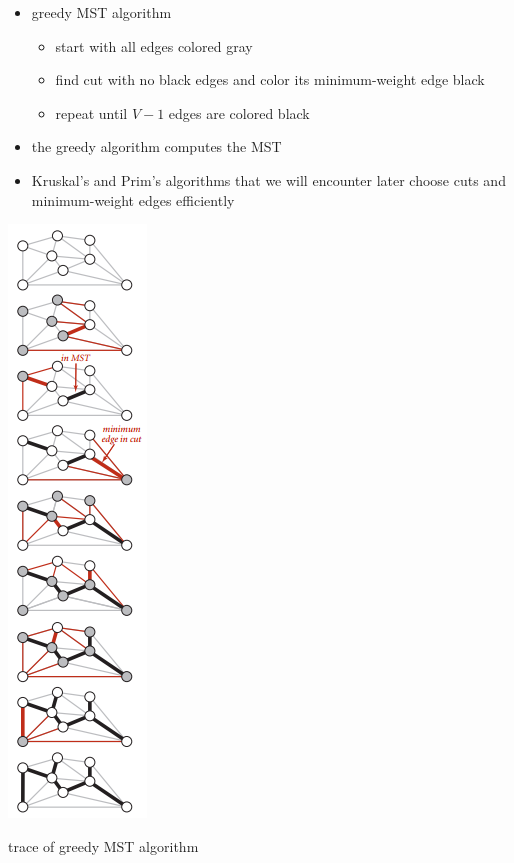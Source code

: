 \documentclass[8pt,a4paper,compress]{beamer}
\begin{document}
\begin{frame}[fragile]
\begin{minipage}{200pt}
\begin{itemize}
\item greedy MST algorithm
\begin{itemize}
\item start with all edges colored gray

\item find cut with no black edges and color its minimum-weight edge black

\item repeat until $V - 1$ edges are colored black
\end{itemize}

\item the greedy algorithm computes the MST

\item Kruskal's and Prim's algorithms that we will encounter later choose cuts and minimum-weight edges efficiently
\end{itemize}
\end{minipage}%
\begin{minipage}{100pt}
\begin{center}
\includegraphics[scale=0.4]{./figures/mst3.png}

\smallskip

\tiny trace of greedy MST algorithm
\end{center}
\end{minipage}
\end{frame}
\end{document}
